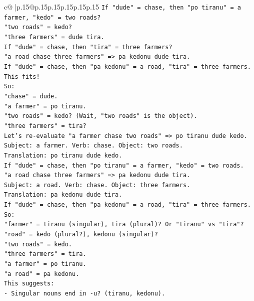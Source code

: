 \documentclass{article}
\begin{document}
{\begin{supertabular}{c@{$\;$}|p{.15\linewidth}@{}p{.15\linewidth}p{.15\linewidth}p{.15\linewidth}p{.15\linewidth}p{.15\linewidth}}
{{{\texttt{If "dude" = chase, then "po tiranu" = a farmer, "kedo" = two roads?} \\
\texttt{"two roads" = kedo?} \\
\texttt{"three farmers" = dude tira.} \\
\texttt{If "dude" = chase, then "tira" = three farmers?} \\
\texttt{"a road chase three farmers" => pa kedonu dude tira.} \\
\texttt{If "dude" = chase, then "pa kedonu" = a road, "tira" = three farmers.} \\
\texttt{This fits!} \\
\texttt{So:} \\
\texttt{"chase" = dude.} \\
\texttt{"a farmer" = po tiranu.} \\
\texttt{"two roads" = kedo? (Wait, "two roads" is the object).} \\
\texttt{"three farmers" = tira?} \\
\texttt{Let's re{-}evaluate "a farmer chase two roads" => po tiranu dude kedo.} \\
\texttt{Subject: a farmer. Verb: chase. Object: two roads.} \\
\texttt{Translation: po tiranu dude kedo.} \\
\texttt{If "dude" = chase, then "po tiranu" = a farmer, "kedo" = two roads.} \\
\texttt{"a road chase three farmers" => pa kedonu dude tira.} \\
\texttt{Subject: a road. Verb: chase. Object: three farmers.} \\
\texttt{Translation: pa kedonu dude tira.} \\
\texttt{If "dude" = chase, then "pa kedonu" = a road, "tira" = three farmers.} \\
\texttt{So:} \\
\texttt{"farmer" = tiranu (singular), tira (plural)? Or "tiranu" vs "tira"?} \\
\texttt{"road" = kedo (plural?), kedonu (singular)?} \\
\texttt{"two roads" = kedo.} \\
\texttt{"three farmers" = tira.} \\
\texttt{"a farmer" = po tiranu.} \\
\texttt{"a road" = pa kedonu.} \\
\texttt{This suggests:} \\
\texttt{{-} Singular nouns end in {-}u? (tiranu, kedonu).} \\
}}}
\end{supertabular}}
\end{document}
